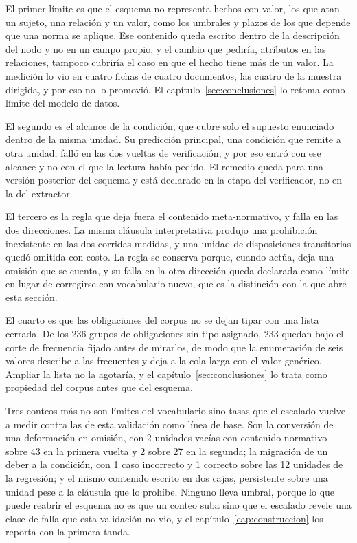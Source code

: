 \documentclass[12pt,a4paper]{report}
\begin{document}
El primer límite es que el esquema no representa hechos con valor, los que atan un sujeto, una relación y un valor, como los umbrales y plazos de los que depende que una norma se aplique. Ese contenido queda escrito dentro de la descripción del nodo y no en un campo propio, y el cambio que pediría, atributos en las relaciones, tampoco cubriría el caso en que el hecho tiene más de un valor. La medición lo vio en cuatro fichas de cuatro documentos, las cuatro de la muestra dirigida, y por eso no lo promovió. El capítulo~\ref{sec:conclusiones} lo retoma como límite del modelo de datos.

El segundo es el alcance de la condición, que cubre solo el supuesto enunciado dentro de la misma unidad. Su predicción principal, una condición que remite a otra unidad, falló en las dos vueltas de verificación, y por eso entró con ese alcance y no con el que la lectura había pedido. El remedio queda para una versión posterior del esquema y está declarado en la etapa del verificador, no en la del extractor.

El tercero es la regla que deja fuera el contenido meta-normativo, y falla en las dos direcciones. La misma cláusula interpretativa produjo una prohibición inexistente en las dos corridas medidas, y una unidad de disposiciones transitorias quedó omitida con costo. La regla se conserva porque, cuando actúa, deja una omisión que se cuenta, y su falla en la otra dirección queda declarada como límite en lugar de corregirse con vocabulario nuevo, que es la distinción con la que abre esta sección.

El cuarto es que las obligaciones del corpus no se dejan tipar con una lista cerrada. De los 236 grupos de obligaciones sin tipo asignado, 233 quedan bajo el corte de frecuencia fijado antes de mirarlos, de modo que la enumeración de seis valores describe a las frecuentes y deja a la cola larga con el valor genérico. Ampliar la lista no la agotaría, y el capítulo~\ref{sec:conclusiones} lo trata como propiedad del corpus antes que del esquema.

Tres conteos más no son límites del vocabulario sino tasas que el escalado vuelve a medir contra las de esta validación como línea de base. Son la conversión de una deformación en omisión, con 2 unidades vacías con contenido normativo sobre 43 en la primera vuelta y 2 sobre 27 en la segunda; la migración de un deber a la condición, con 1 caso incorrecto y 1 correcto sobre las 12 unidades de la regresión; y el mismo contenido escrito en dos cajas, persistente sobre una unidad pese a la cláusula que lo prohíbe. Ninguno lleva umbral, porque lo que puede reabrir el esquema no es que un conteo suba sino que el escalado revele una clase de falla que esta validación no vio, y el capítulo~\ref{cap:construccion} los reporta con la primera tanda. 
\end{document}
